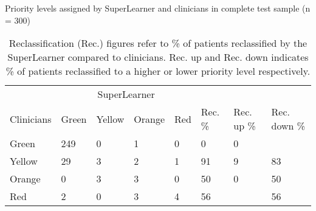 \documentclass[10pt,letterpaper]{article}\usepackage[]{graphicx}\usepackage[]{color}
\begin{document}
\begin{table}[ht]
\centering
\caption{Priority levels assigned by SuperLearner and clinicians in complete test sample (n = 300)} 
\label{tab:reclass_all}
\begin{tabular}{llllllll}
  \hline
  & \multicolumn{4}{c}{SuperLearner} \\
 Clinicians & Green & Yellow & Orange & Red & Rec. \% & Rec. up \% & Rec. down \% \\
 \hline
Green & 249 & 0 & 1 & 0 & 0 & 0 &  \\ 
  Yellow & 29 & 3 & 2 & 1 & 91 & 9 & 83 \\ 
  Orange & 0 & 3 & 3 & 0 & 50 & 0 & 50 \\ 
  Red & 2 & 0 & 3 & 4 & 56 &  & 56 \\ 
   \hline
\end{tabular}
\caption*{Reclassification (Rec.) figures refer to \% of patients reclassified by the SuperLearner compared to clinicians. Rec. up and Rec. down indicates \% of patients reclassified to a higher or lower priority level respectively.} 
\end{table}


\end{document}
